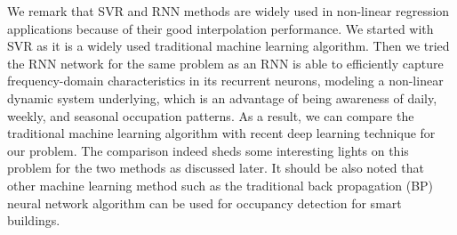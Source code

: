 \textcolor{feb18rev}{We
  remark that SVR and RNN methods are widely used in non-linear
  regression applications because of their good interpolation
  performance.  We started with SVR as it is a widely used traditional
  machine learning algorithm. Then we tried the RNN network for the
  same problem as an RNN is able to efficiently capture
  frequency-domain characteristics in its recurrent neurons, modeling
  a non-linear dynamic system underlying, which is an advantage of
  being awareness of daily, weekly, and seasonal occupation patterns.
  As a result, we can compare the traditional machine learning
  algorithm with recent deep learning technique for our problem. The
  comparison indeed sheds some interesting lights on this problem for
  the two methods as discussed later.  It should be also noted that
  other machine learning method such as the traditional back
  propagation (BP) neural network algorithm can be used for occupancy
  detection for smart buildings.}

